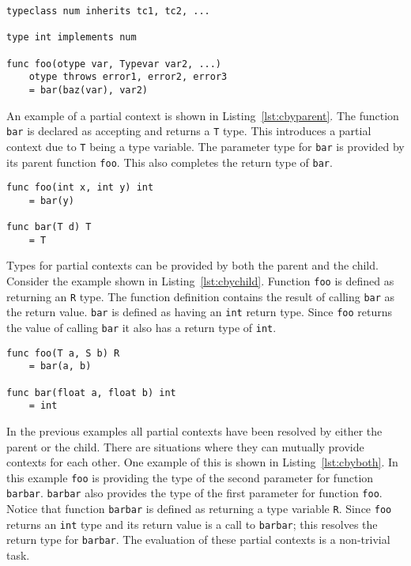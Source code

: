\documentclass{acm_proc_article-sp}
\begin{document}
\begin{lstlisting}[caption=Grammar displayed informally,language=Paratype,label=lst:informalg]
typeclass num inherits tc1, tc2, ...

type int implements num

func foo(otype var, Typevar var2, ...)
    otype throws error1, error2, error3
    = bar(baz(var), var2)
\end{lstlisting}

An example of a partial context is shown in Listing~\ref{lst:cbyparent}. The
function \lstinline!bar! is declared as accepting and returns a \lstinline!T!
type.  This introduces a partial context due to \lstinline!T! being a type
variable. The parameter type for \lstinline!bar! is provided by its parent
function \lstinline!foo!. This also completes the return type of
\lstinline!bar!.

\begin{lstlisting}[caption=Explicit context provided by parents,language=Paratype,label=lst:cbyparent]
func foo(int x, int y) int
    = bar(y)

func bar(T d) T
    = T
\end{lstlisting}

Types for partial contexts can be provided by both the parent and the child.
Consider the example shown in Listing~\ref{lst:cbychild}. Function
\lstinline!foo!  is defined as returning an \lstinline!R! type. The function
definition contains the result of calling \lstinline!bar! as the return value.
\lstinline!bar! is defined as having an \lstinline!int! return type. Since
\lstinline!foo! returns the value of calling \lstinline!bar! it also has a
return type of \lstinline!int!.

\begin{lstlisting}[caption=Explicit context provided by child,language=Paratype,label=lst:cbychild]
func foo(T a, S b) R
    = bar(a, b)

func bar(float a, float b) int
    = int
\end{lstlisting}

In the previous examples all partial contexts have been resolved by either the
parent or the child. There are situations where they can mutually provide
contexts for each other. One example of this is shown in
Listing~\ref{lst:cbyboth}. In this example \lstinline!foo! is providing
the type of the second parameter for function \lstinline!barbar!.
\lstinline!barbar!  also provides the type of the first parameter for function
\lstinline!foo!. Notice that function \lstinline!barbar! is defined as
returning a type variable \lstinline!R!. Since \lstinline!foo! returns an
\lstinline!int! type and its return value is a call to \lstinline!barbar!; this
resolves the return type for \lstinline!barbar!. The evaluation of these
partial contexts is a non-trivial task.
\end{document}
